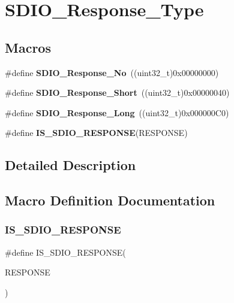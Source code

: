 \section{S\+D\+I\+O\+\_\+\+Response\+\_\+\+Type}
\label{group__SDIO__Response__Type}
\subsection*{Macros}
\begin{DoxyCompactItemize}
\item 
\#define \textbf{ S\+D\+I\+O\+\_\+\+Response\+\_\+\+No}~((uint32\+\_\+t)0x00000000)
\item 
\#define \textbf{ S\+D\+I\+O\+\_\+\+Response\+\_\+\+Short}~((uint32\+\_\+t)0x00000040)
\item 
\#define \textbf{ S\+D\+I\+O\+\_\+\+Response\+\_\+\+Long}~((uint32\+\_\+t)0x000000\+C0)
\item 
\#define \textbf{ I\+S\+\_\+\+S\+D\+I\+O\+\_\+\+R\+E\+S\+P\+O\+N\+SE}(R\+E\+S\+P\+O\+N\+SE)
\end{DoxyCompactItemize}


\subsection{Detailed Description}


\subsection{Macro Definition Documentation}
\mbox{\label{group__SDIO__Response__Type_gae4df2359c9b637694b9baa220c16e062}} 
\subsubsection{I\+S\+\_\+\+S\+D\+I\+O\+\_\+\+R\+E\+S\+P\+O\+N\+SE}
{\footnotesize\ttfamily \#define I\+S\+\_\+\+S\+D\+I\+O\+\_\+\+R\+E\+S\+P\+O\+N\+SE(\begin{DoxyParamCaption}\item[{}]{R\+E\+S\+P\+O\+N\+SE }\end{DoxyParamCaption})}

